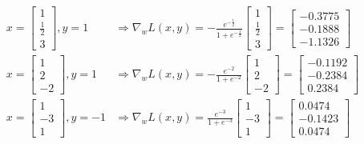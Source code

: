 \begin{solution}
  \begin{align*}
    x =
      \begin{bmatrix}
        1 \\ \frac{1}{2} \\ 3
      \end{bmatrix},
    y = 1
    &\Rightarrow
    \nabla_w L(x,y) =
      -\frac{e^{-\frac{1}{2}}}{1+e^{-\frac{1}{2}}}
      \begin{bmatrix}
        1 \\ \frac{1}{2} \\ 3
      \end{bmatrix}
      =
      \begin{bmatrix}
        -0.3775 \\ -0.1888 \\ -1.1326
      \end{bmatrix}\\
    x =
      \begin{bmatrix}
        1 \\ 2 \\ -2
      \end{bmatrix},
    y = 1
    &\Rightarrow
    \nabla_w L(x,y) =
      -\frac{e^{-2}}{1+e^{-2}}
      \begin{bmatrix}
        1 \\ 2 \\ -2
      \end{bmatrix}
      =
      \begin{bmatrix}
        -0.1192 \\ -0.2384 \\ 0.2384
      \end{bmatrix}\\
    x =
      \begin{bmatrix}
        1 \\-3 \\ 1
      \end{bmatrix},
    y = -1
    &\Rightarrow
    \nabla_w L(x,y) =
      \frac{e^{-3}}{1+e^{-3}}
      \begin{bmatrix}
        1 \\-3 \\ 1
      \end{bmatrix}
      =
      \begin{bmatrix}
        0.0474 \\ -0.1423 \\ 0.0474
      \end{bmatrix}
  \end{align*}
\end{solution}

